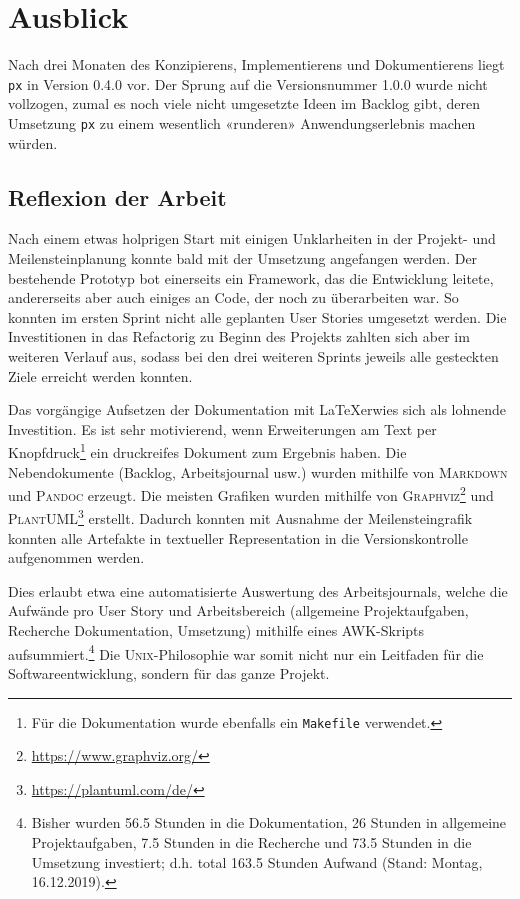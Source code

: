 \section{Ausblick}

Nach drei Monaten des Konzipierens, Implementierens und Dokumentierens liegt \texttt{px} in Version 0.4.0 vor. Der Sprung auf die Versionsnummer 1.0.0 wurde nicht vollzogen, zumal es noch viele nicht umgesetzte Ideen im Backlog gibt, deren Umsetzung \texttt{px} zu einem wesentlich «runderen» Anwendungserlebnis machen würden.

\subsection{Reflexion der Arbeit}

Nach einem etwas holprigen Start mit einigen Unklarheiten in der Projekt- und Meilensteinplanung konnte bald mit der Umsetzung angefangen werden. Der bestehende Prototyp bot einerseits ein Framework, das die Entwicklung leitete, andererseits aber auch einiges an Code, der noch zu überarbeiten war. So konnten im ersten Sprint nicht alle geplanten User Stories umgesetzt werden. Die Investitionen in das Refactorig zu Beginn des Projekts zahlten sich aber im weiteren Verlauf aus, sodass bei den drei weiteren Sprints jeweils alle gesteckten Ziele erreicht werden konnten.

Das vorgängige Aufsetzen der Dokumentation mit \LaTeX erwies sich als lohnende Investition. Es ist sehr motivierend, wenn Erweiterungen am Text per Knopfdruck\footnote{Für die Dokumentation wurde ebenfalls ein \texttt{Makefile} verwendet.} ein druckreifes Dokument zum Ergebnis haben. Die Nebendokumente (Backlog, Arbeitsjournal usw.) wurden mithilfe von \textsc{Markdown} und \textsc{Pandoc} erzeugt. Die meisten Grafiken wurden mithilfe von \textsc{Graphviz}\footnote{\url{https://www.graphviz.org/}} und \textsc{PlantUML}\footnote{\url{https://plantuml.com/de/}} erstellt. Dadurch konnten mit Ausnahme der Meilensteingrafik konnten alle Artefakte in textueller Representation in die Versionskontrolle aufgenommen werden.

Dies erlaubt etwa eine automatisierte Auswertung des Arbeitsjournals, welche die Aufwände pro User Story und Arbeitsbereich (allgemeine Projektaufgaben, Recherche Dokumentation, Umsetzung) mithilfe eines \textsc{AWK}-Skripts aufsummiert.\footnote{Bisher wurden 56.5 Stunden in die Dokumentation, 26 Stunden in allgemeine Projektaufgaben, 7.5 Stunden in die Recherche und 73.5 Stunden in die Umsetzung investiert; d.h. total 163.5 Stunden Aufwand (Stand: Montag, 16.12.2019).} Die \textsc{Unix}-Philoso\-phie war somit nicht nur ein Leitfaden für die Softwareentwicklung, sondern für das ganze Projekt.


